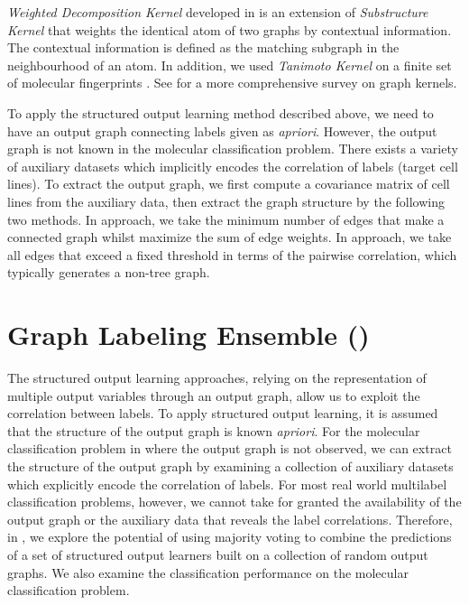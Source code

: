 {%
\textit{Weighted Decomposition Kernel} developed in \citep{Menchetti05weighted,Ceroni08classification} is an extension of \textit{Substructure Kernel} \citep{Haussler99convolution} that weights the identical atom of two graphs by contextual information.
The contextual information is defined as the matching subgraph in the neighbourhood of an atom.
In addition, we used \textit{Tanimoto Kernel} \citep{Ralaivola05graph} on a finite set of molecular fingerprints \citep{Wang09pubchem}.
See \citep{Vishwanathan10graph} for a more comprehensive survey on graph kernels.

To apply the structured output learning method described above, we need to have an output graph connecting labels given as \textit{apriori}.
However, the output graph is not known in the molecular classification problem.
There exists a variety of auxiliary datasets \citep{Shoemaker06the} which implicitly encodes the correlation of labels (target cell lines).
To extract the output graph, we first compute a covariance matrix of cell lines from the auxiliary data, then extract the graph structure by the following two methods.
In  approach, we take the minimum number of edges that make a connected graph whilst maximize the sum of edge weights.
In  approach, we take all edges that exceed a fixed threshold in terms of the pairwise correlation, which typically generates a non-tree graph.



%
%
\section{Graph Labeling Ensemble (\mve)}\label{sc_su11}

The structured output learning approaches, relying on the representation of multiple output variables through an output graph, allow us to exploit the correlation between labels.
To apply structured output learning, it is assumed that the structure of the output graph is known \textit{apriori}.
For the molecular classification problem in  where the output graph is not observed, we can extract the structure of the output graph by examining a collection of auxiliary datasets which explicitly encode the correlation of labels.
For most real world multilabel classification problems, however, we cannot take for granted the availability of the output graph or the auxiliary data that reveals the label correlations.
Therefore, in , we explore the potential of using majority voting to combine the predictions of a set of structured output learners built on a collection of random output graphs.
We also examine the classification performance on the molecular classification problem.


}
